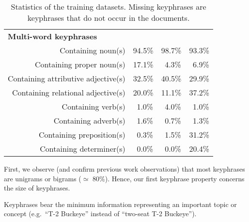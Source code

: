 \begin{table}
\begin{tabular}{lr|ccc}
        \hline
        \multicolumn{2}{l|}{\textbf{Multi-word keyphrases}}\\
        \multicolumn{2}{r|}{Containing noun(s)} & 94.5\% & 98.7\% & 93.3\%\\
        \multicolumn{2}{r|}{Containing proper noun(s)} & 17.1\% & $~~$4.3\% & $~~$6.9\%\\
        \multicolumn{2}{r|}{Containing attributive adjective(s)} & 32.5\% & 40.5\% & 29.9\%\\
        \multicolumn{2}{r|}{Containing relational adjective(s)} & 20.0\% & 11.1\% & 37.2\%\\
        \multicolumn{2}{r|}{Containing verb(s)} & $~~$1.0\% & $~~$4.0\% & $~~$1.0\%\\
        \multicolumn{2}{r|}{Containing adverb(s)} & $~~$1.6\% & $~~$0.7\% & $~~$1.3\%\\
        \multicolumn{2}{r|}{Containing preposition(s)} & $~~$0.3\% & $~~$1.5\% & 31.2\%\\
        \multicolumn{2}{r|}{Containing determiner(s)} & $~~$0.0\% & $~~$0.0\% & 20.4\%\\
        \bottomrule
      \end{tabular}
      \caption{Statistics of the training datasets. Missing keyphrases are
               keyphrases that do not occur in the documents.
               \label{tab:train_dataset_statistics}}
    \end{table}

    First, we observe (and confirm previous work observations) that most
    keyphrases are unigrams or bigrams ($\simeq$ 80\%). Hence, our first
    keyphrase property concerns the size of keyphrases.
    
    \begin{property}\label{prop:informativity}
      Keyphrases bear the minimum information representing an important topic or
      concept (e.g.~``T-2 Buckeye'' instead of ``two-seat T-2 Buckeye'').
    \end{property}

